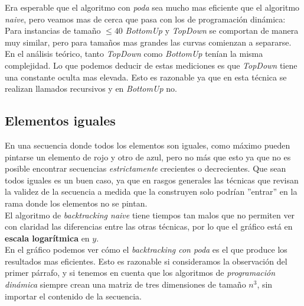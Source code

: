 Era esperable que el algoritmo con \textit{poda} sea mucho mas eficiente que el algoritmo \textit{naive}, pero veamos mas de cerca que pasa con los de programación dinámica: \\


Para instancias de tamaño $\leq 40$ \textit{BottomUp} y \textit{TopDown} se comportan de manera muy similar, pero para tamaños mas grandes las curvas comienzan a separarse. En el análisis teórico, tanto \textit{TopDown} como \textit{BottomUp} tenían la misma complejidad. Lo que podemos deducir de estas mediciones es que \textit{TopDown} tiene una constante oculta mas elevada. Esto es razonable ya que en esta técnica se realizan llamados recursivos y en \textit{BottomUp} no. 

\subsection{Elementos iguales}

En una secuencia donde todos los elementos son iguales, como máximo pueden pintarse un elemento de rojo y otro de azul, pero no más que esto ya que no es posible encontrar secuencias \textit{estrictamente} crecientes o decrecientes. Que sean todos iguales es un buen caso, ya que en rasgos generales las técnicas que revisan la validez de la secuencia a medida que la construyen solo podrían ''entrar'' en la rama donde los elementos no se pintan. \\

El algoritmo de \textit{backtracking naive} tiene tiempos tan malos que no permiten ver con claridad las diferencias entre las otras técnicas, por lo que el gráfico está en \textbf{escala logarítmica} en $y$.\\

En el gráfico podemos ver cómo el \textit{backtracking con poda} es el que produce los resultados mas eficientes. Esto es razonable si consideramos la observación del primer párrafo, y si tenemos en cuenta que los algoritmos de \textit{programación dinámica} siempre crean una matriz de tres dimensiones de tamaño $n^3$, sin importar el contenido de la secuencia. \\


